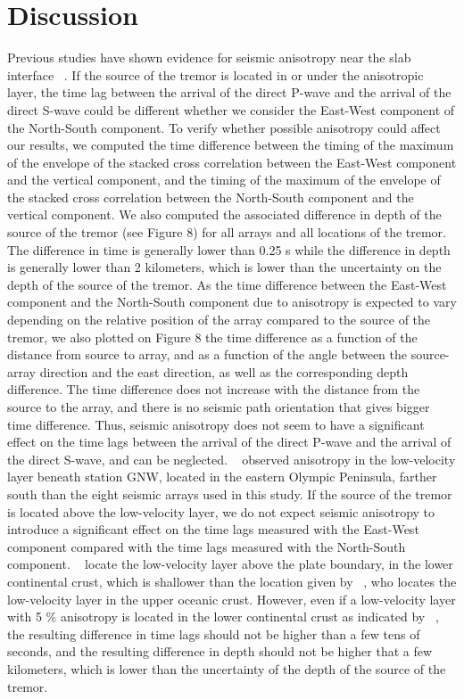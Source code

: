 \documentclass[draft]{agujournal2019}
\begin{document}
\section{Discussion}

Previous studies have shown evidence for seismic anisotropy near the slab interface ~\cite{NIK_2009}. If the source of the tremor is located in or under the anisotropic layer, the time lag between the arrival of the direct P-wave and the arrival of the direct S-wave could be different whether we consider the East-West component of the North-South component. To verify whether possible anisotropy could affect our results, we computed the time difference between the timing of the maximum of the envelope of the stacked cross correlation between the East-West component and the vertical component, and the timing of the maximum of the envelope of the stacked cross correlation between the North-South component and the vertical component. We also computed the associated difference in depth of the source of the tremor (see Figure 8) for all arrays and all locations of the tremor. The difference in time is generally lower than 0.25 s while the difference in depth is generally lower than 2 kilometers, which is lower than the uncertainty on the depth of the source of the tremor. As the time difference between the East-West component and the North-South component due to anisotropy is expected to vary depending on the relative position of the array compared to the source of the tremor, we also plotted on Figure 8 the 
time difference as a function of the distance from source to array, and as a function of the angle between the source-array direction and the east direction, as well as the corresponding depth difference. The time difference does not increase with the distance from the source to the array, and there is no seismic path orientation that gives bigger time difference. Thus, seismic anisotropy does not seem to have a significant effect on the time lags between the arrival of the direct P-wave and the arrival of the direct S-wave, and can be neglected. ~ observed anisotropy in the low-velocity layer beneath station GNW, located in the eastern Olympic Peninsula, farther south than the eight seismic arrays used in this study. If the source of the tremor is located above the low-velocity layer, we do not expect seismic anisotropy to introduce a significant effect on the time lags measured with the East-West component compared with the time lags measured with the North-South component. ~ locate the low-velocity layer above the plate boundary, in the lower continental crust, which is shallower than the location given by ~, who locates the low-velocity layer in the upper oceanic crust. However, even if a low-velocity layer with 5 \% anisotropy is located in the lower continental crust as indicated by ~, the resulting difference in time lags should not be higher than a few tens of seconds, and the resulting difference in depth should not be higher that a few kilometers, which is lower than the uncertainty of the depth of the source of the tremor.
\end{document}

